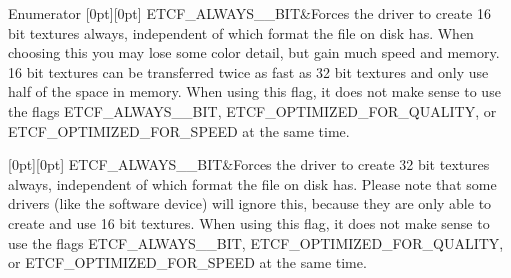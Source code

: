 \begin{DoxyEnumFields}{Enumerator}
[0pt][0pt]{}\mbox{\label{namespaceirr_1_1video_acaf6f7414534f7d62bff18c5bf11876fa4fe1c1b0f4b44ef4b5da219ce66a0ae8}} 
E\+T\+C\+F\+\_\+\+A\+L\+W\+A\+Y\+S\+\_\+\_\+\+B\+IT&Forces the driver to create 16 bit textures always, independent of which format the file on disk has. When choosing this you may lose some color detail, but gain much speed and memory. 16 bit textures can be transferred twice as fast as 32 bit textures and only use half of the space in memory. When using this flag, it does not make sense to use the flags E\+T\+C\+F\+\_\+\+A\+L\+W\+A\+Y\+S\+\_\+\_\+\+B\+IT, E\+T\+C\+F\+\_\+\+O\+P\+T\+I\+M\+I\+Z\+E\+D\+\_\+\+F\+O\+R\+\_\+\+Q\+U\+A\+L\+I\+TY, or E\+T\+C\+F\+\_\+\+O\+P\+T\+I\+M\+I\+Z\+E\+D\+\_\+\+F\+O\+R\+\_\+\+S\+P\+E\+ED at the same time. \\
\hline

[0pt][0pt]{}\mbox{\label{namespaceirr_1_1video_acaf6f7414534f7d62bff18c5bf11876fa20881e307a778c4a4fbb5327a60a93bb}} 
E\+T\+C\+F\+\_\+\+A\+L\+W\+A\+Y\+S\+\_\+\_\+\+B\+IT&Forces the driver to create 32 bit textures always, independent of which format the file on disk has. Please note that some drivers (like the software device) will ignore this, because they are only able to create and use 16 bit textures. When using this flag, it does not make sense to use the flags E\+T\+C\+F\+\_\+\+A\+L\+W\+A\+Y\+S\+\_\+\_\+\+B\+IT, E\+T\+C\+F\+\_\+\+O\+P\+T\+I\+M\+I\+Z\+E\+D\+\_\+\+F\+O\+R\+\_\+\+Q\+U\+A\+L\+I\+TY, or E\+T\+C\+F\+\_\+\+O\+P\+T\+I\+M\+I\+Z\+E\+D\+\_\+\+F\+O\+R\+\_\+\+S\+P\+E\+ED at the same time. \\
\hline


\end{DoxyEnumFields}
